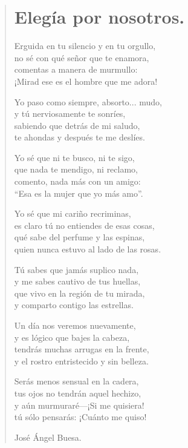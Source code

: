\documentclass[11pt, portrait, twoside, notitlepage, openright]{book}
\begin{document}
\newpage
\begin{verse}
\begin{center}
\section{Elegía por nosotros.}
\end{center}
Erguida en tu silencio y en tu orgullo,\\
no sé con qué señor que te enamora,\\
comentas a manera de murmullo:\\
¡Mirad ese es el hombre que me adora!
\newline

Yo paso como siempre, absorto... mudo,\\
y tú nerviosamente te sonríes,\\
sabiendo que detrás de mi saludo,\\
te ahondas y después te me deslíes.
\newline

Yo sé que ni te busco, ni te sigo,\\
que nada te mendigo, ni reclamo,\\
comento, nada más con un amigo:\\
``Esa es la mujer que yo más amo”.
\newline

Yo sé que mi cariño recriminas,\\
es claro tú no entiendes de esas cosas,\\
qué sabe del perfume y las espinas,\\
quien nunca estuvo al lado de las rosas.
\newline

Tú sabes que jamás suplico nada,\\
y me sabes cautivo de tus huellas,\\
que vivo en la región de tu mirada,\\
y comparto contigo las estrellas.
\newpage
 
Un día nos veremos nuevamente,\\
y es lógico que bajes la cabeza,\\
tendrás muchas arrugas en la frente,\\
y el rostro entristecido y sin belleza.
\newline

Serás menos sensual en la cadera,\\
tus ojos no tendrán aquel hechizo,\\
y aún murmuraré—¡Si me quisiera!\\
tú sólo pensarás: ¡Cuánto me quiso!
\newline

José Ángel Buesa.
\end{verse}
\end{document}
